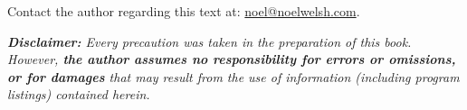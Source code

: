 \begin{center}

Contact the author regarding this text at: \href{mailto:noel@noelwelsh.com}{noel@noelwelsh.com}.

\vspace{3em}


\textit{\textbf{Disclaimer:} Every precaution was taken in the preparation of this book. However, \textbf{the author assumes no responsibility for errors or omissions, or for damages} that may result from the use of information (including program listings) contained herein.}

\end{center}
